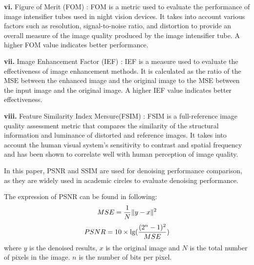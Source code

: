 \documentclass[conference]{IEEEtran}
\begin{document}
{\bf vi.} Figure of Merit (FOM) \cite{balian1977figure}: FOM is a metric used to evaluate the performance of image intensifier tubes used in night vision devices. It takes into account various factors such as resolution, signal-to-noise ratio, and distortion to provide an overall measure of the image quality produced by the image intensifier tube. A higher FOM value indicates better performance.

{\bf vii.} Image Enhancement Factor (IEF) \cite{badamchizadeh2004comparative}: IEF is a measure used to evaluate the effectiveness of image enhancement methods. It is calculated as the ratio of the MSE between the enhanced image and the original image to the MSE between the input image and the original image. A higher IEF value indicates better effectiveness.

{\bf viii.} Feature Similarity Index Mersure(FSIM) \cite{zhang2011fsim}: FSIM is a full-reference image quality assessment metric that compares the similarity of the structural information and luminance of distorted and reference images. It takes into account the human visual system's sensitivity to contrast and spatial frequency and has been shown to correlate well with human perception of image quality.

In this paper, PSNR and SSIM are used for denoising performance comparison, as they are widely used in academic circles to evaluate denoising performance.

The expression of PSNR can be found in following:
\begin{equation}
	\setlength{\abovedisplayskip}{0pt}
	\setlength{\belowdisplayskip}{0pt}
	MSE = \frac{1}{N} \Vert y-x \Vert^2
	\label{eq:MSE}
\end{equation}
\begin{equation}
	\setlength{\abovedisplayskip}{0pt}
	\setlength{\belowdisplayskip}{0pt}
	PSNR= 10 \times \lg (\frac{(2^n -1)^2}{MSE})
	\label{eq:PSNR}
\end{equation}
where $y$ is the denoised results, $x$ is the original image and $N$ is the total number of pixels in the image. $n$ is the number of bits per pixel. 
\end{document}
